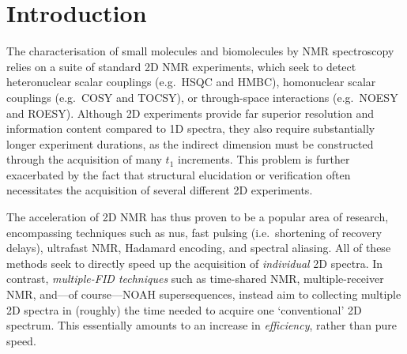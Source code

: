 \section{Introduction}
\label{sec:noah__introduction}

The characterisation of small molecules and biomolecules by NMR spectroscopy relies on a suite of standard 2D NMR experiments, which seek to detect heteronuclear scalar couplings (e.g.\ HSQC and HMBC), homonuclear scalar couplings (e.g.\ COSY and TOCSY), or through-space interactions (e.g.\ NOESY and ROESY).
Although 2D experiments provide far superior resolution and information content compared to 1D spectra, they also require substantially longer experiment durations, as the indirect dimension must be constructed through the acquisition of many $t_1$ increments.
This problem is further exacerbated by the fact that structural elucidation or verification often necessitates the acquisition of several different 2D experiments.

The acceleration of 2D NMR has thus proven to be a popular area of research, encompassing techniques such as
\acf{nus}\autocite{Barna1987JMR,Kazimierczuk2010PNMRS,Mobli2014PNMRS,Kazimierczuk2015MRC},
fast pulsing (i.e.\ shortening of recovery delays)\autocite{SchulzeSunninghausen2014JACS,Schanda2006JACS,Kupce2007MRC,Schanda2009PNMRS},
ultrafast NMR\autocite{Frydman2002PNASUSA,Pelupessy2003JACS,Frydman2003JACS,Tal2010PNMRS,Gouilleux2018ARNMRS,Kupce2021NRMP},
Hadamard encoding\autocite{Kupce2003JMR,Kupce2003PNMRS},
and spectral aliasing\autocite{Jeannerat2000MRC,Bermel2009JACS,Njock2010C}.
All of these methods seek to directly speed up the acquisition of \textit{individual} 2D spectra.
In contrast, \textit{multiple-FID techniques} such as
time-shared NMR\autocite{Nolis2007ACIE,Parella2010CMR},
multiple-receiver NMR\autocite{Kupce2006JACS,Kupce2008JACS,Kovacs2016MRC},
and---of course---NOAH supersequences\autocite{Kupce2017ACIE,Kupce2021PNMRS,Kupce2021NRMP},
instead aim to collecting multiple 2D spectra in (roughly) the time needed to acquire one `conventional' 2D spectrum.
This essentially amounts to an increase in \textit{efficiency}, rather than pure speed.

